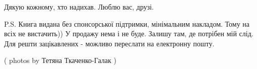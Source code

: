 Дякую кожному, хто надихав. Люблю вас, друзі.

P.S. Книга видана без спонсорської підтримки, мінімальним накладом. Тому на
всіх не вистачить))  У продажу нема і не буде. Залишу там, де потрібен мій
слід. Для решти зацікавлених - можливо переслати на електронну пошту.

( photos by Тетяна Ткаченко-Галак )

